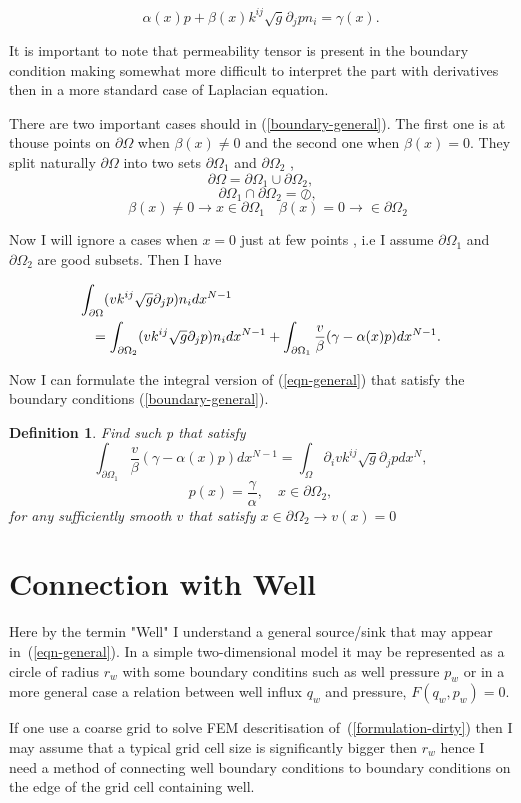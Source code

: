 \documentclass{article}
\def\eqn#1{\begin{displaymath}#1\end{displaymath}}
\def\eqnl#1#2{\begin{equation}\label{#1}#2\end{equation}}
\def\eqnm#1{\begin{eqnarray*}#1\end{eqnarray*}}
\def\rf#1{(\ref{#1})}
\theoremstyle{marginbreak} \theorembodyfont{\itshape}
\newtheorem{Def}{Definition}
\begin{document}
\eqnl{boundary-general}{
\alpha(x) p + \beta(x) k^{ij} \sqrt{g} \partial_j p n_i = \gamma(x).
}

It is important to note that permeability tensor is present in the boundary
condition making somewhat more difficult to interpret the part with
derivatives then in a more standard case of Laplacian equation.

There are two important cases should in \rf{boundary-general}. The first one
is at thouse points on $\partial\Omega$ when $\beta(x) \ne 0$ and the second
one when $\beta(x) = 0$. They split naturally $\partial\Omega$ into two sets
$\partial\Omega_1$ and $\partial\Omega_2$ ,
\eqnl{b-is-zero-split}{
\partial\Omega = \partial\Omega_1 \cup \partial\Omega_2 ,
}
\eqn{
\quad \partial\Omega_1 \cap \partial\Omega_2  = \oslash,
}
\eqn{
\quad \beta(x) \ne 0 \rightarrow x \in  \partial\Omega_1
\quad \beta(x) = 0 \rightarrow \in  \partial\Omega_2
}

Now I will ignore a cases when $x = 0$ just at few points , i.e I assume
$\partial\Omega_1$ and $\partial\Omega_2$ are good subsets. Then I have

\eqnm{
\lefteqn{\int_{\partial\Omega} (v k^{ij} \sqrt{g} \partial_j p) n_i dx^{N-1}}
\\
&&=\int_{\partial\Omega_2} (v k^{ij} \sqrt{g} \partial_j p) n_i dx^{N-1}
+
\int_{\partial\Omega_1} \frac{v}{\beta} (\gamma -  \alpha(x) p) dx^{N-1}.
}

Now I can formulate the integral version of \rf{eqn-general} that satisfy
the boundary conditions \rf{boundary-general}.

\begin{Def}  \label{problem-def}
Find such p that satisfy
\eqnl{formulation-dirty}{
\int_{\partial\Omega_1} \frac{v}{\beta} (\gamma -  \alpha(x) p) dx^{N-1}
 = \int_\Omega \partial_i v k^{ij} \sqrt{g} \partial_j p dx^N,
}\eqn{
 p(x) = \frac{\gamma}{\alpha}, \quad x \in \partial\Omega_2 ,
}
for any sufficiently smooth $v$ that satisfy
$x \in \partial\Omega_2 \rightarrow v(x) = 0$
\end{Def}

\section{Connection with Well}
Here by the termin "Well" I understand a general source/sink that may appear
in~\rf{eqn-general}. In a simple two-dimensional model it may be represented
as a circle of radius $r_w$ with some boundary conditins such as well
pressure $p_w$ or in a more general case a relation between well influx
$q_w$ and
pressure, $F(q_w, p_w) = 0$.
\par
If one use a coarse grid to solve FEM descritisation
of~\rf{formulation-dirty} then I may assume that a typical grid cell size
is significantly bigger then $r_w$ hence I need a method of connecting
well boundary conditions to boundary conditions on the edge of the grid cell
containing well.
\end{document}
